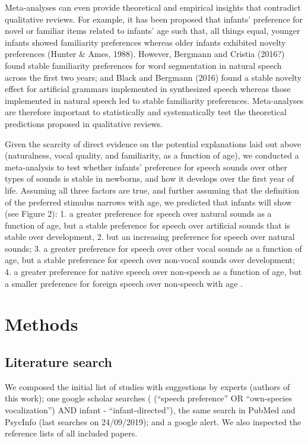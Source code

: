 \documentclass[man]{apa6}
\begin{document}
Meta-analyses can even provide theoretical and empirical insights that
contradict qualitative reviews. For example, it has been proposed that
infants' preference for novel or familiar items related to infants' age
such that, all things equal, younger infants showed familiarity
preferences whereas older infants exhibited novelty preferences (Hunter
\& Ames, 1988). However, Bergmann and Cristia (2016?) found stable
familiarity preferences for word segmentation in natural speech across
the first two years; and Black and Bergmann (2016) found a stable
novelty effect for artificial grammars implemented in synthesized speech
whereas those implemented in natural speech led to stable familiarity
preferences. Meta-analyses are therefore important to statistically and
systematically test the theoretical predictions proposed in qualitative
reviews.

Given the scarcity of direct evidence on the potential explanations laid
out above (naturalness, vocal quality, and familiarity, as a function of
age), we conducted a meta-analysis to test whether infants' preference
for speech sounds over other types of sounds is stable in newborns, and
how it develops over the first year of life. Assuming all three factors
are true, and further assuming that the definition of the preferred
stimulus narrows with age, we predicted that infants will show (see
Figure 2): 1. a greater preference for speech over natural sounds as a
function of age, but a stable preference for speech over artificial
sounds that is stable over development, 2. but an increasing preference
for speech over natural sounds; 3. a greater preference for speech over
other vocal sounds as a function of age, but a stable preference for
speech over non-vocal sounds over development; 4. a greater preference
for native speech over non-speech as a function of age, but a smaller
preference for foreign speech over non-speech with age .

\section{Methods}\label{methods}

\subsection{Literature search}\label{literature-search}

We composed the initial list of studies with suggestions by experts
(authors of this work); one google scholar searches ( (\enquote{speech
preference} OR \enquote{own-species vocalization}) AND infant -
\enquote{infant-directed}), the same search in PubMed and PsycInfo (last
searches on 24/09/2019); and a google alert. We also inspected the
reference lists of all included papers.
\end{document}
